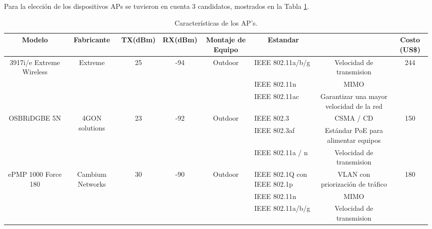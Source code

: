 Para la elección de los dispositivos APs se tuvieron en cuenta 3 candidatos, mostrados en la Tabla \ref{tab:caracteristicas-aps}.

\begin{table}[H]
  \tiny
  \centering
    \begin{tabular}{|c|c|c|c|c|l|c|c|}
    \hline
    \rowcolor[rgb]{ .773,  .851,  .945} \textbf{Modelo} & \textbf{Fabricante} & \textbf{TX(dBm)} & \textbf{RX(dBm)} & \textbf{Montaje de Equipo} & \multicolumn{1}{c|}{\textbf{Estandar}} &       & \textbf{Costo (US\$)} \bigstrut\\
    \hline
    \multirow{3}[6]{*}{3917i/e Extreme Wireless} & \multirow{3}[6]{*}{Extreme} & \multirow{3}[6]{*}{25} & \multirow{3}[6]{*}{-94} & \multirow{3}[6]{*}{Outdoor} & IEEE 802.11a/b/g & Velocidad de transmision   & \multirow{3}[6]{*}{244} \bigstrut\\
\cline{6-7}          &       &       &       &       & IEEE 802.11n & MIMO  &  \bigstrut\\
\cline{6-7}          &       &       &       &       & IEEE 802.11ac & \textcolor[rgb]{ .125,  .129,  .141}{Garantizar una mayor velocidad de la red} &  \bigstrut\\
    \hline
    \multirow{3}[6]{*}{OSBRiDGBE 5N} & \multirow{3}[6]{*}{4GON solutions} & \multirow{3}[6]{*}{23} & \multirow{3}[6]{*}{-92} & \multirow{3}[6]{*}{Outdoor} & IEEE 802.3 & CSMA / CD & \multirow{3}[6]{*}{150} \bigstrut\\
\cline{6-7}          &       &       &       &       & IEEE 802.3af & Estándar PoE para alimentar equipos &  \bigstrut\\
\cline{6-7}          &       &       &       &       & IEEE 802.11a / n & Velocidad de transmision &  \bigstrut\\
    \hline
    \multirow{3}[6]{*}{ePMP 1000 Force 180} & \multirow{3}[6]{*}{Cambium Networks} & \multirow{3}[6]{*}{30} & \multirow{3}[6]{*}{-90} & \multirow{3}[6]{*}{Outdoor} & IEEE 802.1Q con IEEE 802.1p & VLAN con priorización de tráfico  & \multirow{3}[6]{*}{180 \cite{E14}} \bigstrut\\
\cline{6-7}          &       &       &       &       & IEEE 802.11n & MIMO  &  \bigstrut\\
\cline{6-7}          &       &       &       &       & IEEE 802.11a/b/g & Velocidad de transmision  &  \bigstrut\\
    \hline
    \end{tabular}%
	\caption{Características de los AP's.}
  \label{tab:caracteristicas-aps}%
\end{table}%



